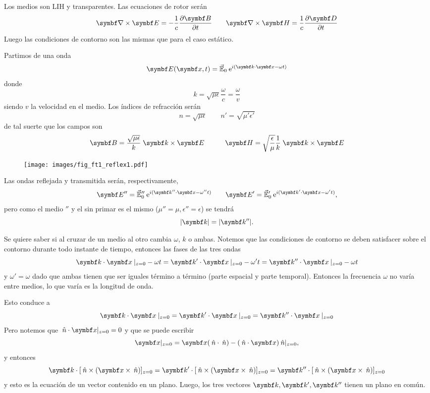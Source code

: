\documentclass[10pt,oneside]{CBFT_book}
\begin{document}
Los medios son LIH y transparentes. Las ecuaciones de rotor serán
\[
	\rotorm{E} = -\frac{1}{c} \dpar{\vb{B}}{t} \qquad 
	\rotorm{H} = \frac{1}{c} \dpar{\vb{D}}{t}
\]
Luego las condiciones de contorno son las mismas que para el caso estático.

Partimos de una onda
\[
	\vb{E}( \vb{x},t )= \vec{\mathbb{E}}_0 \euler^{i( \pe{k}{x} -\omega t)}
\]
donde 
\[
	k = \sqrt{\mu\epsilon} \frac{\omega}{c} = \frac{\omega}{v}
\]
siendo $v$ la velocidad en el medio. Los índices de refracción serán 
\[
	n = \sqrt{\mu \epsilon} \qquad  n' = \sqrt{\mu' \epsilon'}
\]
de tal suerte que los campos son 
\[
	\vb{B} = \frac{\sqrt{\mu\epsilon}}{k} \; \pv{k}{E} \qquad \quad 
		\vb{H} = \sqrt{\frac{\epsilon}{\mu}} \frac{1}{k} \; \pv{k}{E}
\]
\begin{figure}[htb]
	\begin{center}
	\texttt{[image: images/fig\_ft1\_reflex1.pdf]}	 
	\end{center}
	\caption{}
\end{figure} 

Las ondas reflejada y transmitida serán, respectivamente,
\[
	\vb{E}'' = \vec{\mathbb{E}}_0'' \euler^{i( \pe{k''}{x} -\omega'' t)} \qquad 
	\vb{E}' = \vec{\mathbb{E}}_0' \euler^{i( \pe{k'}{x} -\omega' t)},
\]
pero como el medio $''$ y el sin primar es el mismo ($\mu''= \mu, \epsilon''=\epsilon$) 
se tendrá 
\[
	|\vb{k}| = |\vb{k}''|.
\]

Se quiere saber si al cruzar de un medio al otro cambia $\omega$, $k$ o ambas.
Notemos que las condiciones de contorno se deben satisfacer sobre el contorno durante
todo instante de tiempo, entonces las fases de las tres ondas
\[
	\pe{k}{x}\:|_{z=0} - \omega t = 
	\pe{k'}{x}\:|_{z=0} - \omega' t  = 
	\pe{k''}{x}\:|_{z=0} - \omega t 
\]
y $\omega' = \omega $ dado que ambas tienen que ser iguales término a término 
(parte espacial y parte temporal).
Entonces la frecuencia $\omega$ no varía entre medios, lo que varía es la longitud
de onda.

Esto conduce a
\[
	\pe{k}{x}\:|_{z=0} = \pe{k'}{x}\:|_{z=0}  = \pe{k''}{x}\:|_{z=0} 
\]
Pero notemos que $ \nver \cdot \vbx|_{z=0} = 0$ y que se puede escribir
\[
	\vb{x}|_{z=0} = \vbx (\nver\cdot\nver) - (\nver\cdot\vbx)\nver |_{z=0},
\]
y entonces
\[
	\vb{k}\cdot [ \nver \times ( \vbx \times \nver ) ]_{z=0} =
	\vb{k}'\cdot [ \nver \times ( \vbx \times \nver ) ]_{z=0} =
	\vb{k}''\cdot [ \nver \times ( \vbx \times \nver ) ]_{z=0}
\]
y esto es la ecuación de un vector contenido en un plano. Luego, los tres vectores 
$\vb{k}, \vb{k}', \vb{k}''$  tienen un plano en común.
\end{document}
